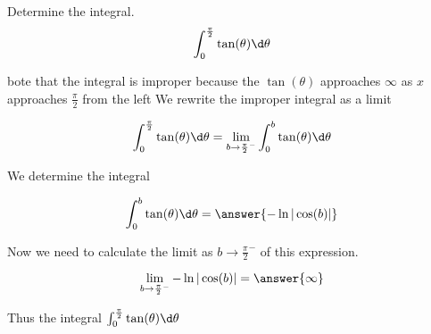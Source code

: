 \documentclass{ximera}
\author{Jason Miller}
\begin{document}
\begin{exercise}
Determine the integral.
\[
\int_{0}^{\frac{\pi}{2}} \tan(\theta) \d \theta 
\]

bote that the integral is improper because the $\tan(\theta)$ approaches $\infty$ as $x$ approaches $\frac{\pi}{2}$ from the left
We  rewrite the improper integral as a limit

\[
\int_{0}^{\frac{\pi}{2}} \tan(\theta) \d \theta=\lim_{b \to {\frac{\pi}{2}}^{-}} \int_{0}^{b} \tan(\theta) \d \theta
\]

We determine the integral

\[
\int_{0}^{b} \tan(\theta) \d \theta= \answer{-\ln|\cos(b)| }
\]


\begin{exercise}
Now we need to calculate the limit as $b \to {\frac{\pi}{2}}^{-}$ of this expression. 

\[
\lim_{b \to {\frac{\pi}{2}}^{-}} -\ln| \cos(b) |= \answer{  \infty }
\]

\begin{exercise}
Thus the integral $\int_{0}^{\frac{\pi}{2}} \tan(\theta) \d \theta$ 

\begin{multipleChoice}
\end{multipleChoice}




\end{exercise}
\end{exercise}
\end{exercise}
\end{document}
